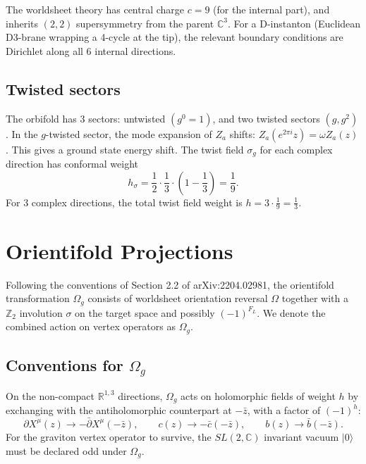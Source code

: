 \documentclass[11pt]{article}
\newcommand{\Z}{\mathbb{Z}}
\newcommand{\C}{\mathbb{C}}
\newcommand{\R}{\mathbb{R}}
\newcommand{\oo}{\Omega_g}
\begin{document}
The worldsheet theory has central charge $c = 9$ (for the internal part), and inherits $(2,2)$ supersymmetry from the parent $\C^3$. For a D-instanton (Euclidean D3-brane wrapping a 4-cycle at the tip), the relevant boundary conditions are Dirichlet along all 6 internal directions.

\subsection{Twisted sectors}

The orbifold has 3 sectors: untwisted $(g^0 = 1)$, and two twisted sectors $(g, g^2)$. In the $g$-twisted sector, the mode expansion of $Z_a$ shifts: $Z_a(e^{2\pi i}z) = \omega Z_a(z)$. This gives a ground state energy shift. The twist field $\sigma_g$ for each complex direction has conformal weight
\begin{equation}
h_{\sigma} = \frac{1}{2} \cdot \frac{1}{3} \cdot \left(1 - \frac{1}{3}\right) = \frac{1}{9}.
\end{equation}
For 3 complex directions, the total twist field weight is $h = 3 \cdot \frac{1}{9} = \frac{1}{3}$.

\section{Orientifold Projections}

Following the conventions of Section 2.2 of arXiv:2204.02981, the orientifold transformation $\oo$ consists of worldsheet orientation reversal $\Omega$ together with a $\Z_2$ involution $\sigma$ on the target space and possibly $(-1)^{F_L}$. We denote the combined action on vertex operators as $\oo$.

\subsection{Conventions for $\oo$}

On the non-compact $\R^{1,3}$ directions, $\oo$ acts on holomorphic fields of weight $h$ by exchanging with the antiholomorphic counterpart at $-\bar{z}$, with a factor of $(-1)^h$:
\begin{equation}\label{eq:Omegaconvention}
\partial X^\mu(z) \to -\bar{\partial} X^\mu(-\bar{z}), \qquad c(z) \to -\bar{c}(-\bar{z}), \qquad b(z) \to \bar{b}(-\bar{z}).
\end{equation}
For the graviton vertex operator to survive, the $SL(2,\C)$ invariant vacuum $|0\rangle$ must be declared odd under $\oo$.
\end{document}
